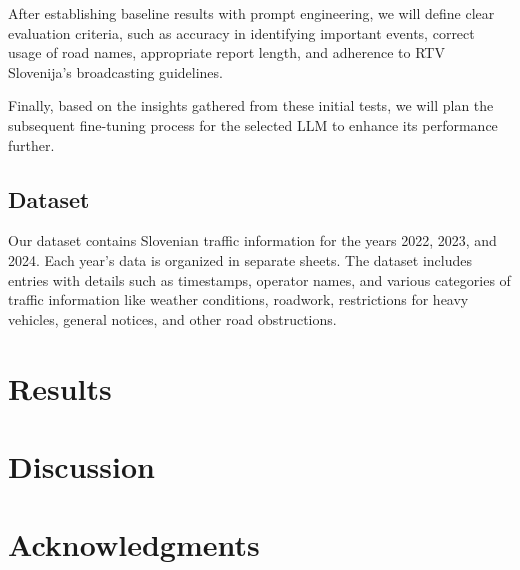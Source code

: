 \documentclass[fleqn,moreauthors,10pt]{ds_report}
\begin{document}
After establishing baseline results with prompt engineering, we will define clear evaluation criteria, such as accuracy in identifying important events, correct usage of road names, appropriate report length, and adherence to RTV Slovenija’s broadcasting guidelines.

Finally, based on the insights gathered from these initial tests, we will plan the subsequent fine-tuning process for the selected LLM to enhance its performance further.

\subsection{Dataset}

Our dataset contains Slovenian traffic information for the years 2022, 2023, and 2024. Each year's data is organized in separate sheets. The dataset includes entries with details such as timestamps, operator names, and various categories of traffic information like weather conditions, roadwork, restrictions for heavy vehicles, general notices, and other road obstructions.


\section*{Results}



\section*{Discussion}



\section*{Acknowledgments}




\end{document}
